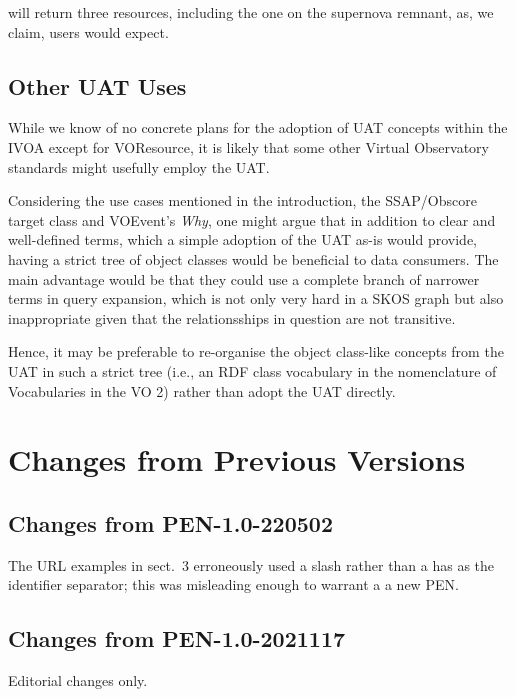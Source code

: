 \documentclass[11pt,a4paper]{ivoa}
\begin{document}
\noindent will return three resources, including 
the one on the supernova remnant,
as, we claim, users would expect.

\subsection{Other UAT Uses}

While we know of no concrete plans for the adoption of UAT concepts
within the IVOA except for
VOResource, it is likely that some other Virtual Observatory
standards might usefully employ the UAT.  

Considering the use cases mentioned in the introduction, the
SSAP/Obscore target class and VOEvent's \emph{Why}, one might argue that
in addition to clear and well-defined terms, which a simple adoption
of the UAT as-is would provide, having a strict tree of object
classes would be beneficial to data consumers.  The main advantage would
be that they could use a complete branch of narrower terms in query
expansion, which is not only very hard in a SKOS graph but also
inappropriate given that the relationsships in question are not
transitive.

Hence, it may be preferable to re-organise the object class-like
concepts from the UAT in such a strict tree (i.e., an RDF class
vocabulary in the nomenclature of Vocabularies in the VO 2) rather than
adopt the UAT directly.

\appendix
\section{Changes from Previous Versions}

\subsection{Changes from PEN-1.0-220502}

The URL examples in sect.~3 erroneously used a slash rather than a
has as the identifier separator; this was misleading enough to warrant a
a new PEN.

\subsection{Changes from PEN-1.0-2021117}

Editorial changes only.

{}
\end{document}
